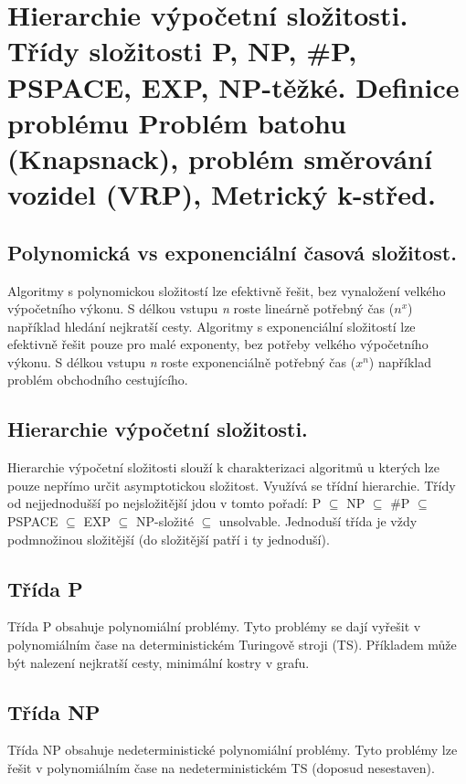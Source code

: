 \section{Hierarchie výpočetní složitosti. Třídy složitosti P, NP, \#P, PSPACE, EXP, NP-těžké. Definice problému Problém batohu (Knapsnack), problém směrování vozidel (VRP), Metrický k-střed.}

\subsection{Polynomická vs exponenciální časová složitost.}

Algoritmy s polynomickou složitostí lze efektivně řešit, bez vynaložení velkého výpočetního výkonu. 
S délkou vstupu \textit{n} roste lineárně potřebný čas ($n^x$) například hledání nejkratší cesty. 
Algoritmy s exponenciální složitostí lze efektivně řešit pouze pro malé exponenty, bez potřeby velkého výpočetního výkonu. 
S délkou vstupu \textit{n} roste exponenciálně potřebný čas ($x^n$) například problém obchodního cestujícího.

\subsection{Hierarchie výpočetní složitosti.}

Hierarchie výpočetní složitosti slouží k charakterizaci algoritmů u kterých lze pouze nepřímo určit asymptotickou složitost. 
Využívá se třídní hierarchie. 
Třídy od nejjednodušší po nejsložitější jdou v tomto pořadí: P $\subseteq$ NP $\subseteq$ \#P $\subseteq$ PSPACE $\subseteq$ EXP $\subseteq$ NP-složité $\subseteq$ unsolvable. 
Jednoduší třída je vždy podmnožinou složitější (do složitější patří i ty jednoduší).

\subsection{Třída P}

Třída P obsahuje polynomiální problémy. 
Tyto problémy se dají vyřešit v polynomiálním čase na deterministickém Turingově stroji (TS). 
Příkladem může být nalezení nejkratší cesty, minimální kostry v grafu.

\subsection{Třída NP}

Třída NP obsahuje nedeterministické polynomiální problémy. 
Tyto problémy lze řešit v polynomiálním čase na nedeterministickém TS (doposud nesestaven).

